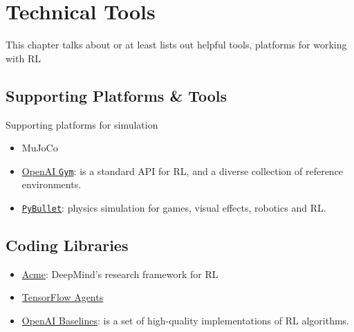 \chapter{Technical Tools}

This chapter talks about or at least lists out helpful tools, platforms for working with \ac{RL}

\section{Supporting Platforms \& Tools}
Supporting platforms for simulation
\begin{itemize}
	\item MuJoCo
	\item \href{https://www.gymlibrary.ml/}{OpenAI \texttt{Gym}}: is a standard API for \ac{RL}, and a diverse collection of reference environments.
	\item \href{https://pybullet.org/wordpress/}{\texttt{PyBullet}}: physics simulation for games, visual effects, robotics and \ac{RL}.
\end{itemize}

\section{Coding Libraries}
\begin{itemize}	
	\item \href{https://github.com/deepmind/acme}{Acme}: DeepMind's research framework for \ac{RL}
	\item \href{https://www.tensorflow.org/agents/overview}{TensorFlow Agents}
	\item \href{https://github.com/openai/baselines}{OpenAI Baselines}: is a set of high-quality implementations of \ac{RL} algorithms.	
\end{itemize}